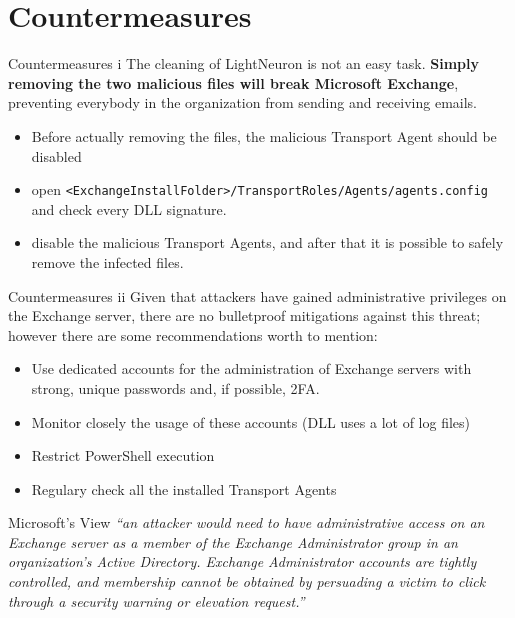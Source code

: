 \section{Countermeasures}

\begin{frame}[fragile]{Countermeasures i}
The cleaning of LightNeuron is not an easy task. \textbf{Simply removing the two malicious files will break
Microsoft Exchange}, preventing everybody in the organization from sending and receiving emails.
        \begin{itemize}
        \item Before actually removing the files, the malicious Transport Agent should be disabled
        \item open \texttt{<ExchangeInstallFolder>/TransportRoles/Agents/agents.config} and check every DLL signature.
        \item disable the malicious Transport Agents, and after that it is possible to safely remove the infected files.
    \end{itemize}
\end{frame}

\begin{frame}[fragile]{Countermeasures ii}
Given that attackers have gained administrative privileges on the Exchange server, there are no bulletproof
        mitigations against this threat; however there are some recommendations worth to mention:
    \begin{itemize}
        \item Use dedicated accounts for the administration of Exchange servers with strong, unique passwords
        and, if possible, 2FA.
        \item Monitor closely the usage of these accounts (DLL uses a lot of log files)
        \item Restrict PowerShell execution
        \item Regulary check all the installed Transport Agents
    \end{itemize}
\end{frame}

\begin{frame}[fragile]{Microsoft’s View}
    \emph{``an attacker would need to have administrative access on an Exchange server as a member of the Exchange
     Administrator group in an organization’s Active Directory.  Exchange Administrator accounts are tightly controlled,
      and membership cannot be obtained by persuading a victim to click through a security warning or elevation request.''} \cite{Petri}
\end{frame}
